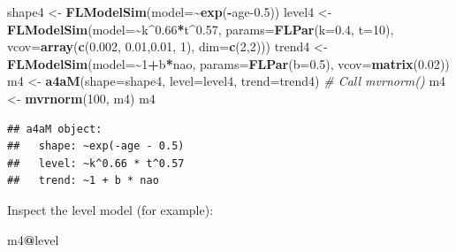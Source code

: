 \documentclass[
]{book}
\newenvironment{Shaded}{\begin{snugshade}}{\end{snugshade}}
\newcommand{\AttributeTok}[1]{\textcolor[rgb]{0.13,0.29,0.53}{#1}}
\newcommand{\CommentTok}[1]{\textcolor[rgb]{0.56,0.35,0.01}{\textit{#1}}}
\newcommand{\DecValTok}[1]{\textcolor[rgb]{0.00,0.00,0.81}{#1}}
\newcommand{\FloatTok}[1]{\textcolor[rgb]{0.00,0.00,0.81}{#1}}
\newcommand{\FunctionTok}[1]{\textcolor[rgb]{0.13,0.29,0.53}{\textbf{#1}}}
\newcommand{\NormalTok}[1]{#1}
\newcommand{\OtherTok}[1]{\textcolor[rgb]{0.56,0.35,0.01}{#1}}
\newcommand{\SpecialCharTok}[1]{\textcolor[rgb]{0.81,0.36,0.00}{\textbf{#1}}}
\begin{document}
\begin{Shaded}
\begin{Highlighting}[]
\NormalTok{shape4 }\OtherTok{\textless{}{-}} \FunctionTok{FLModelSim}\NormalTok{(}\AttributeTok{model=}\SpecialCharTok{\textasciitilde{}}\FunctionTok{exp}\NormalTok{(}\SpecialCharTok{{-}}\NormalTok{age}\FloatTok{{-}0.5}\NormalTok{))}
\NormalTok{level4 }\OtherTok{\textless{}{-}} \FunctionTok{FLModelSim}\NormalTok{(}\AttributeTok{model=}\SpecialCharTok{\textasciitilde{}}\NormalTok{k}\SpecialCharTok{\^{}}\FloatTok{0.66}\SpecialCharTok{*}\NormalTok{t}\SpecialCharTok{\^{}}\FloatTok{0.57}\NormalTok{, }\AttributeTok{params=}\FunctionTok{FLPar}\NormalTok{(}\AttributeTok{k=}\FloatTok{0.4}\NormalTok{, }\AttributeTok{t=}\DecValTok{10}\NormalTok{), }\AttributeTok{vcov=}\FunctionTok{array}\NormalTok{(}\FunctionTok{c}\NormalTok{(}\FloatTok{0.002}\NormalTok{, }\FloatTok{0.01}\NormalTok{,}\FloatTok{0.01}\NormalTok{, }\DecValTok{1}\NormalTok{), }\AttributeTok{dim=}\FunctionTok{c}\NormalTok{(}\DecValTok{2}\NormalTok{,}\DecValTok{2}\NormalTok{)))}
\NormalTok{trend4 }\OtherTok{\textless{}{-}} \FunctionTok{FLModelSim}\NormalTok{(}\AttributeTok{model=}\SpecialCharTok{\textasciitilde{}}\DecValTok{1}\SpecialCharTok{+}\NormalTok{b}\SpecialCharTok{*}\NormalTok{nao, }\AttributeTok{params=}\FunctionTok{FLPar}\NormalTok{(}\AttributeTok{b=}\FloatTok{0.5}\NormalTok{), }\AttributeTok{vcov=}\FunctionTok{matrix}\NormalTok{(}\FloatTok{0.02}\NormalTok{))}
\NormalTok{m4 }\OtherTok{\textless{}{-}} \FunctionTok{a4aM}\NormalTok{(}\AttributeTok{shape=}\NormalTok{shape4, }\AttributeTok{level=}\NormalTok{level4, }\AttributeTok{trend=}\NormalTok{trend4)}
\CommentTok{\# Call mvrnorm()}
\NormalTok{m4 }\OtherTok{\textless{}{-}} \FunctionTok{mvrnorm}\NormalTok{(}\DecValTok{100}\NormalTok{, m4)}
\NormalTok{m4}
\end{Highlighting}
\end{Shaded}

\begin{verbatim}
## a4aM object:
##   shape: ~exp(-age - 0.5)
##   level: ~k^0.66 * t^0.57
##   trend: ~1 + b * nao
\end{verbatim}

Inspect the level model (for example):

\begin{Shaded}
\begin{Highlighting}[]
\NormalTok{m4}\SpecialCharTok{@}\NormalTok{level}
\end{Highlighting}
\end{Shaded}
\end{document}
